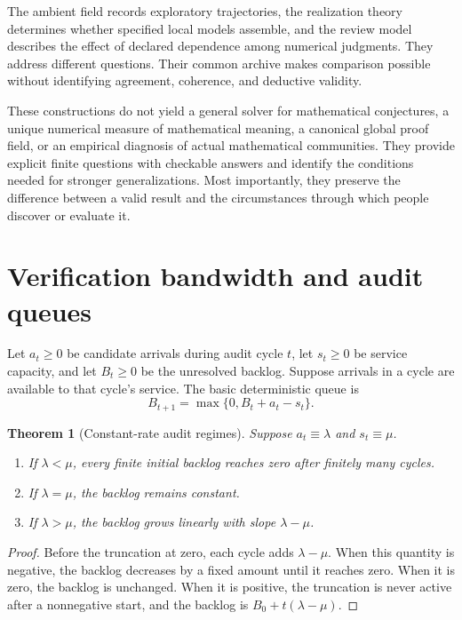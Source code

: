 \documentclass[11pt,oneside]{article}
\theoremstyle{komorebiplain}
\newtheorem{theorem}{Theorem}[section]
\theoremstyle{komorebidefinition}
\theoremstyle{komorebiremark}
\begin{document}
The ambient field records exploratory trajectories, the realization theory determines whether specified local models assemble, and the review model describes the effect of declared dependence among numerical judgments. They address different questions. Their common archive makes comparison possible without identifying agreement, coherence, and deductive validity.

These constructions do not yield a general solver for mathematical conjectures, a unique numerical measure of mathematical meaning, a canonical global proof field, or an empirical diagnosis of actual mathematical communities. They provide explicit finite questions with checkable answers and identify the conditions needed for stronger generalizations. Most importantly, they preserve the difference between a valid result and the circumstances through which people discover or evaluate it.



\section{Verification bandwidth and audit queues}
\label{sec:old18}

Let $a_t\geq0$ be candidate arrivals during audit cycle $t$, let $s_t\geq0$ be service capacity, and let $B_t\geq0$ be the unresolved backlog. Suppose arrivals in a cycle are available to that cycle's service. The basic deterministic queue is
\[
B_{t+1}=\max\{0,B_t+a_t-s_t\}.
\]

\begin{theorem}[Constant-rate audit regimes]
\label{res:18:1}
\label{thm:audit-rates}
Suppose $a_t\equiv\lambda$ and $s_t\equiv\mu$.
\begin{enumerate}[label=\textup{(\roman*)}]
\item If $\lambda<\mu$, every finite initial backlog reaches zero after finitely many cycles.
\item If $\lambda=\mu$, the backlog remains constant.
\item If $\lambda>\mu$, the backlog grows linearly with slope $\lambda-\mu$.
\end{enumerate}
\end{theorem}

\begin{proof}
Before the truncation at zero, each cycle adds $\lambda-\mu$. When this quantity is negative, the backlog decreases by a fixed amount until it reaches zero. When it is zero, the backlog is unchanged. When it is positive, the truncation is never active after a nonnegative start, and the backlog is $B_0+t(\lambda-\mu)$.
\end{proof}
\end{document}
